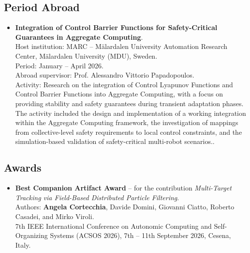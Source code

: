 \documentclass[11pt]{scrartcl}
\newcommand{\pubentry}[6]{%
  \item
  #1.
  \textbf{#2}.
  #3.
  #4.
  \if\relax\detokenize{#6}\relax\else
    \\ DOI: \href{https://doi.org/#6}{\texttt{#6}}%
  \fi

  \begin{sloppypar}
    \vspace{8pt}
    \textit{#5}
    \vspace{8pt}
  \end{sloppypar}
}
\newcommand{\abroadentry}[5]{%
  \item
  \textbf{#1}.\\
  Host institution: #2.\\
  Period: #3.\\
  Abroad supervisor: #4.\\
  Activity: #5.
}
\newcommand{\awardentry}[5]{%
  \item
  \textbf{#1} -- for the contribution \textit{#2}.\\
  Authors: #3.\\
  #4, #5.
}
\newenvironment{awards}
{%
  \subsection*{Awards}
  \begin{itemize}
}
{%
  \end{itemize}
}
\newenvironment{periodabroad}
{%
  \subsection*{Period Abroad}
  \begin{itemize}
}
{%
  \end{itemize}
}
\begin{document}
%

\begin{periodabroad}

  \abroadentry
  {Integration of Control Barrier Functions for Safety-Critical Guarantees in Aggregate Computing}
  {MARC -- Mälardalen University Automation Research Center, Mälardalen University (MDU), Sweden}
  {January -- April 2026}
  {Prof. Alessandro Vittorio Papadopoulos}
  {Research on the integration of Control Lyapunov Functions and Control Barrier Functions into Aggregate Computing, with a focus on providing stability and safety guarantees during transient adaptation phases. The activity included the design and implementation of a working integration within the Aggregate Computing framework, the investigation of mappings from collective-level safety requirements to local control constraints, and the simulation-based validation of safety-critical multi-robot scenarios.}

\end{periodabroad}

%

\begin{awards}

  \awardentry
  {Best Companion Artifact Award}
  {Multi-Target Tracking via Field-Based Distributed Particle Filtering}
  {\textbf{Angela Cortecchia}, Davide Domini, Giovanni Ciatto, Roberto Casadei, and Mirko Viroli}
  {7th IEEE International Conference on Autonomic Computing and Self-Organizing Systems (ACSOS 2026)}
  {7th -- 11th September 2026, Cesena, Italy}

\end{awards}

%
\end{document}
